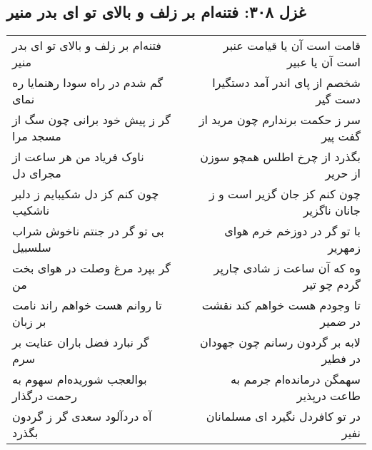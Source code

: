 \begin{center}
\section*{غزل ۳۰۸: فتنه‌ام بر زلف و بالای تو ای بدر منیر}
\label{sec:308}
\begin{longtable}{l p{0.5cm} r}
فتنه‌ام بر زلف و بالای تو ای بدر منیر
&&
قامت است آن یا قیامت عنبر است آن یا عبیر
\\
گم شدم در راه سودا رهنمایا ره نمای
&&
شخصم از پای اندر آمد دستگیرا دست گیر
\\
گر ز پیش خود برانی چون سگ از مسجد مرا
&&
سر ز حکمت برندارم چون مرید از گفت پیر
\\
ناوک فریاد من هر ساعت از مجرای دل
&&
بگذرد از چرخ اطلس همچو سوزن از حریر
\\
چون کنم کز دل شکیبایم ز دلبر ناشکیب
&&
چون کنم کز جان گزیر است و ز جانان ناگزیر
\\
بی تو گر در جنتم ناخوش شراب سلسبیل
&&
با تو گر در دوزخم خرم هوای زمهریر
\\
گر بپرد مرغ وصلت در هوای بخت من
&&
وه که آن ساعت ز شادی چارپر گردم چو تیر
\\
تا روانم هست خواهم راند نامت بر زبان
&&
تا وجودم هست خواهم کند نقشت در ضمیر
\\
گر نبارد فضل باران عنایت بر سرم
&&
لابه بر گردون رسانم چون جهودان در فطیر
\\
بوالعجب شوریده‌ام سهوم به رحمت درگذار
&&
سهمگن درمانده‌ام جرمم به طاعت درپذیر
\\
آه دردآلود سعدی گر ز گردون بگذرد
&&
در تو کافردل نگیرد ای مسلمانان نفیر
\\
\end{longtable}
\end{center}
